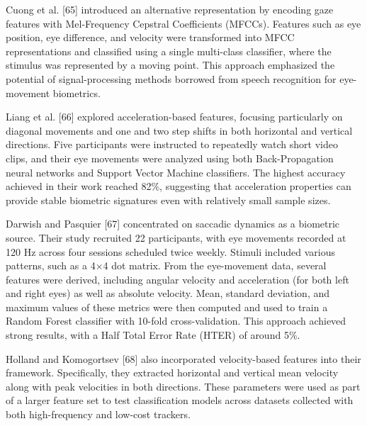 \documentclass{article}
\begin{document}
Cuong et al. [65] introduced an alternative representation by encoding gaze features with Mel-Frequency Cepstral Coefficients (MFCCs). 
Features such as eye position, eye difference, and velocity were transformed into MFCC representations and classified using a single multi-class classifier, where the stimulus was represented by a moving point.
This approach emphasized the potential of signal-processing methods borrowed from speech recognition for eye-movement biometrics.

Liang et al. [66] explored acceleration-based features, focusing particularly on diagonal movements and one and two step shifts in both horizontal and vertical directions.
Five participants were instructed to repeatedly watch short video clips, and their eye movements were analyzed using both Back-Propagation neural networks and Support Vector Machine classifiers. 
The highest accuracy achieved in their work reached 82\%, suggesting that acceleration properties can provide stable biometric signatures even with relatively small sample sizes.

Darwish and Pasquier [67] concentrated on saccadic dynamics as a biometric source. 
Their study recruited 22 participants, with eye movements recorded at 120 Hz across four sessions scheduled twice weekly.
Stimuli included various patterns, such as a 4×4 dot matrix.
From the eye-movement data, several features were derived, including angular velocity and acceleration (for both left and right eyes) as well as absolute velocity. 
Mean, standard deviation, and maximum values of these metrics were then computed and used to train a Random Forest classifier with 10-fold cross-validation. 
This approach achieved strong results, with a Half Total Error Rate (HTER) of around 5\%.

Holland and Komogortsev [68] also incorporated velocity-based features into their framework.
Specifically, they extracted horizontal and vertical mean velocity along with peak velocities in both directions.
These parameters were used as part of a larger feature set to test classification models across datasets collected with both high-frequency and low-cost trackers.
\end{document}
